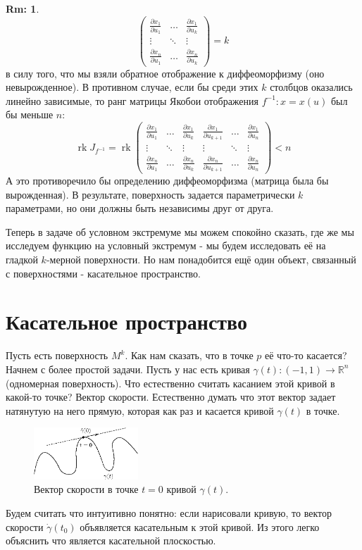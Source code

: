 \documentclass[12pt]{article}
\newcommand{\MR}{\mathbb{R}}
\theoremstyle{definition}
\newtheorem{rem}{Rm:}
\DeclareMathOperator{\rk}{\text{rk}}
\begin{document}
\begin{rem}
$$\begin{pmatrix}
			\tfrac{\partial x_1}{\partial u_1} & \dotsc & \tfrac{\partial x_1}{\partial u_k}\\
			\vdots & \ddots & \vdots \\
			\tfrac{\partial x_n}{\partial u_1} & \dotsc & \tfrac{\partial x_n}{\partial u_k}
		\end{pmatrix}  = k
	$$
	в силу того, что мы взяли обратное отображение к диффеоморфизму (оно невырожденное). В противном случае, если бы среди этих $k$ столбцов оказались линейно зависимые, то ранг матрицы Якобои отображения $f^{-1} \colon  x = x(u)$ был бы меньше $n$:
	$$
		\rk J_{f^{-1}} = \rk \begin{pmatrix}
			\tfrac{\partial x_1}{\partial u_1} & \dotsc & \tfrac{\partial x_1}{\partial u_k} & \tfrac{\partial x_1}{\partial u_{k+1}} & \dotsc & \tfrac{\partial x_1}{\partial u_n}\\
			\vdots & \ddots & \vdots & \vdots & \ddots & \vdots \\
			\tfrac{\partial x_n}{\partial u_1} & \dotsc & \tfrac{\partial x_n}{\partial u_k}  & \tfrac{\partial x_n}{\partial u_{k+1}} & \dotsc & \tfrac{\partial x_n}{\partial u_n}
		\end{pmatrix}  < n
	$$
	А это противоречило бы определению диффеоморфизма (матрица была бы вырожденная). В результате, поверхность задается параметрически $k$ параметрами, но они должны быть независимы друг от друга.
\end{rem}
Теперь в задаче об условном экстремуме мы можем спокойно сказать, где же мы исследуем функцию на условный экстремум - мы будем исследовать её на гладкой $k$-мерной поверхности. Но нам понадобится ещё один объект, связанный с поверхностями - касательное пространство.

\newpage
\section*{Касательное пространство}
Пусть есть поверхность $M^k$. Как нам сказать, что в точке $p$ её что-то касается? Начнем с более простой задачи. Пусть у нас есть кривая $\gamma(t) \colon (-1,1) \to \MR^n$ (одномерная поверхность). Что естественно считать касанием этой кривой в какой-то точке? Вектор скорости. Естественно думать что этот вектор задает натянутую на него прямую, которая как раз и касается кривой $\gamma(t)$  в точке.
\begin{figure}[H]
	\centering
	\includegraphics[width=0.35\textwidth]{19_8.eps}
	\caption{Вектор скорости в точке $t = 0$ кривой $\gamma(t)$.}
	\label{19_8}
\end{figure}
Будем считать что интуитивно понятно: если нарисовали кривую, то вектор скорости $\dot{\gamma}(t_0)$ объявляется касательным к этой кривой. Из этого легко объяснить что является касательной плоскостью.
\end{document}
